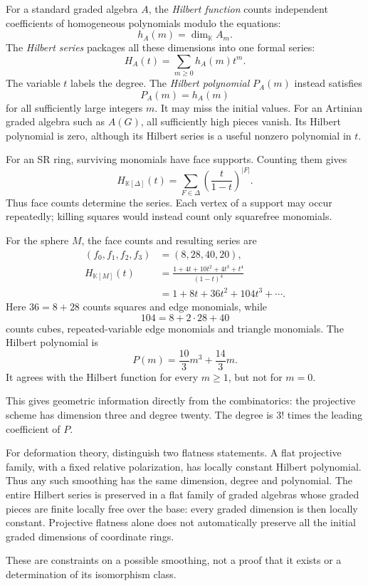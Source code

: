 \begin{remark}
\label{remark-session-hilbert-reminder}
For a standard graded algebra $A$,
the \emph{Hilbert function} counts
independent coefficients of homogeneous
polynomials modulo the equations:
$$
h_A(m)=\dim_{\mathbb K}A_m.
$$
The \emph{Hilbert series} packages all
these dimensions into one formal series:
$$
H_A(t)=\sum_{m\geq0}h_A(m)t^m.
$$
The variable $t$ labels the degree.
The \emph{Hilbert polynomial} $P_A(m)$
instead satisfies
$$
P_A(m)=h_A(m)
$$
for all sufficiently large integers $m$.
It may miss the initial values.
For an Artinian graded algebra such as
$A(G)$, all sufficiently high pieces
vanish. Its Hilbert polynomial is zero,
although its Hilbert series is a useful
nonzero polynomial in $t$.

For an SR ring, surviving monomials
have face supports. Counting them gives
$$
H_{\mathbb K[\Delta]}(t)
=\sum_{F\in\Delta}
\left(\frac{t}{1-t}\right)^{|F|}.
$$
Thus face counts determine the series.
Each vertex of a support may occur
repeatedly; killing squares would
instead count only squarefree monomials.

For the sphere $M$, the face counts
and resulting series are
$$
\begin{aligned}
(f_0,f_1,f_2,f_3)&=(8,28,40,20),\\
H_{\mathbb K[M]}(t)
&=\frac{1+4t+10t^2+4t^3+t^4}{(1-t)^4}\\
&=1+8t+36t^2+104t^3+\cdots.
\end{aligned}
$$
Here $36=8+28$ counts squares and
edge monomials, while
$$
104=8+2\cdot28+40
$$
counts cubes, repeated-variable edge
monomials and triangle monomials.
The Hilbert polynomial is
$$
P(m)=\frac{10}{3}m^3+\frac{14}{3}m.
$$
It agrees with the Hilbert function
for every $m\geq1$, but not for $m=0$.

This gives geometric information directly
from the combinatorics: the projective
scheme has dimension three and degree
twenty. The degree is $3!$ times the
leading coefficient of $P$.

For deformation theory, distinguish two
flatness statements.
A flat projective family, with a fixed
relative polarization, has locally
constant Hilbert polynomial.
Thus any such smoothing has the same
dimension, degree and polynomial.
The entire Hilbert series is preserved
in a flat family of graded algebras
whose graded pieces are finite locally
free over the base: every graded
dimension is then locally constant.
Projective flatness alone does not
automatically preserve all the initial
graded dimensions of coordinate rings.

These are constraints on a possible
smoothing, not a proof that it exists
or a determination of its isomorphism
class.
\end{remark}

